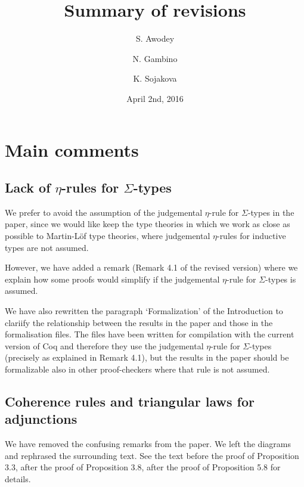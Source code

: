 \documentclass[11pt, oneside]{article}   	%
\title{Summary of revisions}
\author{S. Awodey \and N. Gambino \and K. Sojakova}
\date{April 2nd, 2016}							%
\begin{document}
\maketitle

\section{Main comments}

\subsection{Lack of $\eta$-rules for $\Sigma$-types}

We prefer to avoid the assumption of the judgemental $\eta$-rule for $\Sigma$-types in the paper, since we would like keep the type theories in which we work as close as possible to Martin-L\"of type theories, where judgemental $\eta$-rules for inductive types are  not assumed.

However, we have added a remark (Remark 4.1 of the revised version) where we explain how some proofs would simplify if the judgemental $\eta$-rule for $\Sigma$-types is assumed. 

We have also rewritten the paragraph `Formalization' of the Introduction to clariify the relationship between the results in the paper and those in the formalisation files. The files have been written for compilation with the current version of Coq and therefore they use the judgemental $\eta$-rule for $\Sigma$-types (precisely as explained in Remark 4.1), but the results in the paper should be formalizable also in other proof-checkers
where that rule is not assumed.




\subsection{Coherence rules and triangular laws for adjunctions}

We have removed the confusing remarks from the paper. We left the diagrams and rephrased the surrounding text.  See the text before the proof of Proposition 3.3, after the proof of Proposition 3.8, after the proof of Proposition 5.8  for details.
\end{document}
